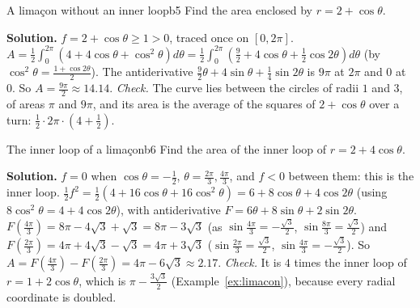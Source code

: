 \documentclass[11pt]{article}
\begin{document}
\begin{exmp}{A limaçon without an inner loop}{b5}
Find the area enclosed by $r=2+\cos\theta$.

\textbf{Solution.} $f=2+\cos\theta\ge1>0$, traced once on $[0,2\pi]$. $A=\frac12\int_0^{2\pi}\left(4+4\cos\theta+\cos^2\theta\right)d\theta=\frac12\int_0^{2\pi}\left(\frac92+4\cos\theta+\frac12\cos2\theta\right)d\theta$ (by $\cos^2\theta=\frac{1+\cos2\theta}2$). The antiderivative $\frac92\theta+4\sin\theta+\frac14\sin2\theta$ is $9\pi$ at $2\pi$ and $0$ at $0$. So $A=\frac{9\pi}2\approx14.14$. \emph{Check.} The curve lies between the circles of radii $1$ and $3$, of areas $\pi$ and $9\pi$, and its area is the average of the squares of $2+\cos\theta$ over a turn: $\frac12\cdot2\pi\cdot\left(4+\frac12\right)$.
\end{exmp}

\begin{exmp}{The inner loop of a limaçon}{b6}
Find the area of the inner loop of $r=2+4\cos\theta$.

\textbf{Solution.} $f=0$ when $\cos\theta=-\frac12$, $\theta=\frac{2\pi}3,\frac{4\pi}3$, and $f<0$ between them: this is the inner loop. $\frac12f^2=\frac12\left(4+16\cos\theta+16\cos^2\theta\right)=6+8\cos\theta+4\cos2\theta$ (using $8\cos^2\theta=4+4\cos2\theta$), with antiderivative $F=6\theta+8\sin\theta+2\sin2\theta$. $F\left(\frac{4\pi}3\right)=8\pi-4\sqrt3+\sqrt3=8\pi-3\sqrt3$ (as $\sin\frac{4\pi}3=-\frac{\sqrt3}2$, $\sin\frac{8\pi}3=\frac{\sqrt3}2$) and $F\left(\frac{2\pi}3\right)=4\pi+4\sqrt3-\sqrt3=4\pi+3\sqrt3$ ($\sin\frac{2\pi}3=\frac{\sqrt3}2$, $\sin\frac{4\pi}3=-\frac{\sqrt3}2$). So $A=F\left(\frac{4\pi}3\right)-F\left(\frac{2\pi}3\right)=4\pi-6\sqrt3\approx2.17$. \emph{Check.} It is $4$ times the inner loop of $r=1+2\cos\theta$, which is $\pi-\frac{3\sqrt3}2$ (Example~\ref{ex:limacon}), because every radial coordinate is doubled.
\end{exmp}
\end{document}
